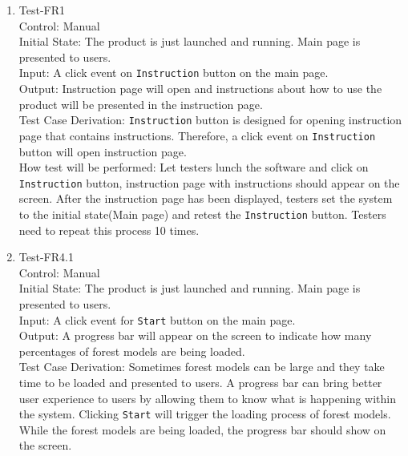 \documentclass[12pt, titlepage]{article}
\begin{document}
\begin{enumerate}
\item{Test-FR1\\}
Control: Manual\\ 

Initial State: The product is just launched and running. Main page
is presented to users.\\

Input: A click event on \verb|Instruction| button on the main page.\\

Output: Instruction page will open and instructions about how to use 
the product will be presented in the instruction page.\\

Test Case Derivation: \verb|Instruction| button is designed for opening 
instruction page that contains instructions. Therefore, a click event on
\verb|Instruction| button will open instruction page.\\
					
How test will be performed: Let testers lunch the software and click on 
\verb|Instruction| button, instruction page with instructions should appear on the 
screen. After the instruction page has been displayed, testers set the system to the 
initial state(Main page) and retest the \verb|Instruction| button. Testers need to 
repeat this process 10 times.

\item{Test-FR4.1\\}
Control: Manual\\ 

Initial State: The product is just launched and running. Main
page is presented to users.\\

Input: A click event for \verb|Start| button on the main page.\\

Output: A progress bar will appear on the screen to indicate how many
percentages of forest models are being loaded.\\

Test Case Derivation: Sometimes forest models can be large and they take
time to be loaded and presented to users. A progress bar can bring better
user experience to users by allowing them to know what is happening within the 
system. Clicking \verb|Start| will trigger the loading process of forest models.
While the forest models are being loaded, the progress bar should show on the screen.\\
					

\end{enumerate}
\end{document}
